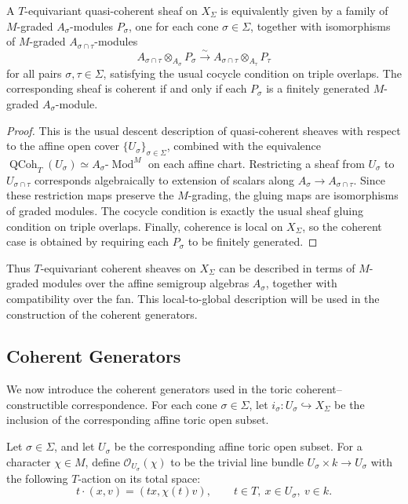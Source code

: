 \begin{proposition}
A \(T\)-equivariant quasi-coherent sheaf on \(X_\Sigma\) is equivalently
given by a family of \(M\)-graded \(A_\sigma\)-modules \(P_\sigma\), one
for each cone \(\sigma\in\Sigma\), together with isomorphisms of
\(M\)-graded \(A_{\sigma\cap\tau}\)-modules
\[
A_{\sigma\cap\tau}\otimes_{A_\sigma}P_\sigma
\xrightarrow{\sim}
A_{\sigma\cap\tau}\otimes_{A_\tau}P_\tau
\]
for all pairs \(\sigma,\tau\in\Sigma\), satisfying the usual cocycle
condition on triple overlaps.  The corresponding sheaf is coherent if
and only if each \(P_\sigma\) is a finitely generated \(M\)-graded
\(A_\sigma\)-module.
\end{proposition}

\begin{proof}
This is the usual descent description of quasi-coherent sheaves with
respect to the affine open cover \(\{U_\sigma\}_{\sigma\in\Sigma}\),
combined with the equivalence
\(\operatorname{QCoh}_T(U_\sigma)\simeq
A_\sigma\text{-}\operatorname{Mod}^M\) on each affine chart.  Restricting
a sheaf from \(U_\sigma\) to \(U_{\sigma\cap\tau}\) corresponds
algebraically to extension of scalars along
\(A_\sigma\to A_{\sigma\cap\tau}\).  Since these restriction maps
preserve the \(M\)-grading, the gluing maps are isomorphisms of graded
modules.  The cocycle condition is exactly the usual sheaf gluing
condition on triple overlaps.  Finally, coherence is local on
\(X_\Sigma\), so the coherent case is obtained by requiring each
\(P_\sigma\) to be finitely generated.
\end{proof}

Thus \(T\)-equivariant coherent sheaves on \(X_\Sigma\) can be described
in terms of \(M\)-graded modules over the affine semigroup algebras
\(A_\sigma\), together with compatibility over the fan.  This
local-to-global description will be used in the construction of the
coherent generators.



\subsection{Coherent Generators}

We now introduce the coherent generators used in the toric
coherent--constructible correspondence.  For each cone
\(\sigma\in\Sigma\), let \(i_\sigma:U_\sigma\hookrightarrow X_\Sigma\)
be the inclusion of the corresponding affine toric open subset. 


\begin{definition}
Let \(\sigma\in\Sigma\), and let \(U_\sigma\) be the corresponding
affine toric open subset.  For a character \(\chi\in M\), define
$
\mathcal O_{U_\sigma}(\chi)
$
to be the trivial line bundle \(U_\sigma\times k\to U_\sigma\) with the
following \(T\)-action on its total space:
\[
t\cdot(x,v)=(tx,\chi(t)v),
\qquad
t\in T,\ x\in U_\sigma,\ v\in k.
\]
\end{definition}


